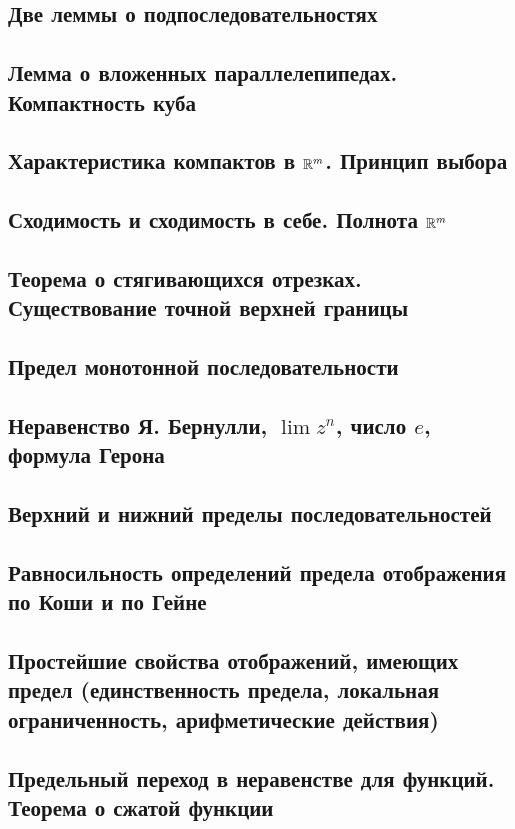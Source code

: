 \subsection{Две леммы о подпоследовательностях}

\skip
\subsection{Лемма о вложенных параллелепипедах. Компактность куба}

\skip
\subsection{Характеристика компактов в $\mathbb{R}^m$. Принцип выбора}

\skip
\subsection{Сходимость и сходимость в себе. Полнота $\mathbb{R}^m$}

\skip
\subsection{Теорема о стягивающихся отрезках. Существование точной верхней границы}

\skip
\subsection{Предел монотонной последовательности}

\skip
\subsection{Неравенство Я. Бернулли, $\lim z^n$, число $e$, формула Герона}

\skip
\subsection{Верхний и нижний пределы последовательностей}

\skip
\subsection{Равносильность определений предела отображения по Коши и по Гейне}

\skip
\subsection{Простейшие свойства отображений, имеющих предел (единственность предела, локальная ограниченность, арифметические действия)}

\skip
\subsection{Предельный переход в неравенстве для функций. Теорема о сжатой функции}

\skip
